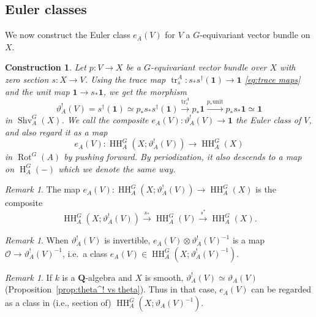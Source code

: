 \documentclass[12pt, oneside]{amsart}
\numberwithin{equation}{section}
\newtheorem{construction}[subsubsection]{Construction}
\theoremstyle{remark}
\newtheorem{remark}[subsubsection]{Remark}
\theoremstyle{plain}
\newcommand{\OO}{\mathcal{O}}
\newcommand{\bQ}{\mathbf{Q}}
\newcommand{\HH}{\operatorname{HH}}
\newcommand{\Hcoh}{\operatorname{H}}
\newcommand{\Shv}{\operatorname{Shv}}
\newcommand{\Rot}{\operatorname{Rot}}
\newcommand{\un}{\mathbf{1}}
\begin{document}
\subsection{Euler classes}\label{ssec:euler}

We now construct the Euler class $e_{A}(V)$ for $V$ a $G$-equivariant vector bundle on $X$.

\begin{construction}
Let $p : V \to X$ be a $G$-equivariant vector bundle over $X$ with zero section $s : X \to V$.
Using the trace map $\operatorname{tr}_s^A : s_*s^\dag(\un) \to \un$ \eqref{eq:trace maps} and the unit map $\un \to s_*\un$, we get the morphism
\[
  \vartheta^!_A(V) = s^\dag(\un) \simeq p_* s_* s^\dag(\un)
  \xrightarrow{\operatorname{tr}^A_s} p_*\un
  \xrightarrow{p_* \mathrm{unit}} p_* s_*\un \simeq \un
\]
in $\Shv_A^G(X)$.
We call the composite $e_A(V) : \vartheta^!_A(V) \to \un$ the \emph{Euler class} of $V$, and also regard it as a map
\[
  e_A(V) : \HH_A^G(X; \vartheta^!_A(V)) \to \HH_A^G(X)
\]
in $\Rot^G(A)$ by pushing forward.
By periodization, it also descends to a map on $\Hcoh_A^G(-)$ which we denote the same way.
\end{construction}

\begin{remark}
The map $e_A(V) : \HH_A^G(X; \vartheta^!_A(V)) \to \HH_A^G(X)$ is the composite
\[
  \HH_A^G(X; \vartheta^!_A(V)) \xrightarrow{s_*}
  \HH_A^G(V) \xrightarrow{s^*}
  \HH_A^G(X).
\]
\end{remark}

\begin{remark}
When $\vartheta^!_A(V)$ is invertible, $e_A(V) \otimes \vartheta^!_A(V)^{-1}$ is a map $\OO \to \vartheta^!_A(V)^{-1}$, i.e.\ a class $e_A(V) \in \HH_A^G(X; \vartheta^!_A(V)^{-1})$.
\end{remark}

\begin{remark}
	If $k$ is a $\bQ$-algebra and $X$ is smooth, $\vartheta^!_A(V) \simeq \vartheta_A(V)$ (Proposition~\ref{prop:theta^! vs theta}).
	Thus in that case, $e_A(V)$ can be regarded as a class in (i.e., section of) $\HH_A^G(X; \vartheta_A(V)^{-1})$.
\end{remark}
\end{document}
